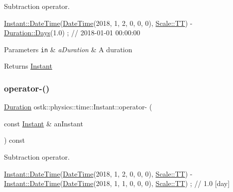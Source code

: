 Subtraction operator. 


\begin{DoxyCode}
\hyperlink{classostk_1_1physics_1_1time_1_1_instant_afd5725574a02389b80fad4baff313c8a}{Instant::DateTime}(\hyperlink{classostk_1_1physics_1_1time_1_1_instant_afd5725574a02389b80fad4baff313c8a}{DateTime}(2018, 1, 2, 0, 0, 0), 
      \hyperlink{namespaceostk_1_1physics_1_1time_adf23d37bd8641fb76a0e98ab46a70df7adf1f3edb9115acb0a1e04209b7a9937b}{Scale::TT}) - \hyperlink{classostk_1_1physics_1_1time_1_1_duration_aefb4abc87c6957d00650228d069fa1e1}{Duration::Days}(1.0) ; \textcolor{comment}{// 2018-01-01 00:00:00}
\end{DoxyCode}



\begin{DoxyParams}[1]{Parameters}
\mbox{\tt in}  & {\em a\+Duration} & A duration \\
\hline
\end{DoxyParams}
\begin{DoxyReturn}{Returns}
\hyperlink{classostk_1_1physics_1_1time_1_1_instant}{Instant} 
\end{DoxyReturn}
\mbox{\label{classostk_1_1physics_1_1time_1_1_instant_aad77e9b8aa2ab6c2d1f18c95a91e6a8e}} 
\subsubsection{\texorpdfstring{operator-\/()}{operator-()}\hspace{0.1cm}{\footnotesize\ttfamily [2/2]}}
{\footnotesize\ttfamily \hyperlink{classostk_1_1physics_1_1time_1_1_duration}{Duration} ostk\+::physics\+::time\+::\+Instant\+::operator-\/ (\begin{DoxyParamCaption}\item[{const \hyperlink{classostk_1_1physics_1_1time_1_1_instant}{Instant} \&}]{an\+Instant }\end{DoxyParamCaption}) const}



Subtraction operator. 


\begin{DoxyCode}
\hyperlink{classostk_1_1physics_1_1time_1_1_instant_afd5725574a02389b80fad4baff313c8a}{Instant::DateTime}(\hyperlink{classostk_1_1physics_1_1time_1_1_instant_afd5725574a02389b80fad4baff313c8a}{DateTime}(2018, 1, 2, 0, 0, 0), 
      \hyperlink{namespaceostk_1_1physics_1_1time_adf23d37bd8641fb76a0e98ab46a70df7adf1f3edb9115acb0a1e04209b7a9937b}{Scale::TT}) - \hyperlink{classostk_1_1physics_1_1time_1_1_instant_afd5725574a02389b80fad4baff313c8a}{Instant::DateTime}(\hyperlink{classostk_1_1physics_1_1time_1_1_instant_afd5725574a02389b80fad4baff313c8a}{DateTime}(2018, 1, 1, 0, 0, 0), 
      \hyperlink{namespaceostk_1_1physics_1_1time_adf23d37bd8641fb76a0e98ab46a70df7adf1f3edb9115acb0a1e04209b7a9937b}{Scale::TT}) ; \textcolor{comment}{// 1.0 [day]}
\end{DoxyCode}



